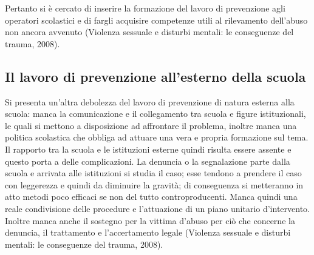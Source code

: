 Pertanto si è cercato di inserire la formazione del lavoro di prevenzione agli operatori scolastici e di fargli acquisire competenze utili al rilevamento dell’abuso non ancora avvenuto (Violenza sessuale e disturbi mentali: le conseguenze del trauma, 2008).
\subsection{Il lavoro di prevenzione all'esterno della scuola}    
Si presenta un’altra debolezza del lavoro di prevenzione di natura esterna alla scuola: manca la comunicazione e il collegamento tra scuola e figure istituzionali, le quali si mettono a disposizione ad affrontare il problema, inoltre manca una politica scolastica che obbliga ad attuare una vera e propria formazione sul tema.
Il rapporto tra la scuola e le istituzioni esterne quindi risulta essere assente e questo porta a delle complicazioni. La denuncia o la segnalazione parte dalla scuola e arrivata alle istituzioni si studia il caso; esse tendono a prendere il caso con leggerezza e quindi da diminuire la gravità; di conseguenza si metteranno in atto metodi poco efficaci se non del tutto controproducenti. Manca quindi una reale condivisione delle procedure e l’attuazione di un piano unitario d’intervento. Inoltre manca anche il sostegno per la vittima d’abuso per ciò che concerne la denuncia, il trattamento e l’accertamento legale (Violenza sessuale e disturbi mentali: le conseguenze del trauma, 2008).  
